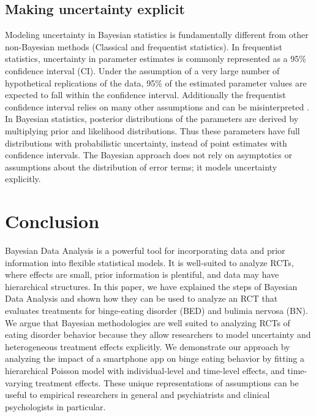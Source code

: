 \documentclass{article}
\begin{document}
\subsection{Making uncertainty explicit}
Modeling uncertainty in Bayesian statistics is fundamentally different from other non-Bayesian methods (Classical and frequentist statistics). In frequentist statistics, uncertainty in parameter estimates is commonly represented as a 95\% confidence interval (CI). Under the assumption of a very large number of hypothetical replications of the data, 95\% of the estimated parameter values are expected to fall within the confidence interval. Additionally the frequentist confidence interval relies on many other assumptions and can be misinterpreted \cite{hoekstra2014robust}. In Bayesian statistics, posterior distributions of the parameters are derived by multiplying prior and likelihood distributions. Thus these parameters have full distributions with probabilistic uncertainty, instead of point estimates with confidence intervals. The Bayesian approach does not rely on asymptotics or assumptions about the distribution of error terms; it models uncertainty explicitly.


\section{Conclusion}
Bayesian Data Analysis is a powerful tool for incorporating data and prior information into flexible statistical models.  It is well-suited to analyze RCTs, where effects are small, prior information is plentiful, and data may have hierarchical structures.  In this paper, we have explained the steps of Bayesian Data Analysis and shown how they can be used to analyze an RCT that evaluates treatments for binge-eating disorder (BED) and bulimia nervosa (BN).  We argue that Bayesian methodologies are well suited to analyzing RCTs of eating disorder behavior because they allow researchers to model uncertainty and heterogeneous treatment effects explicitly. We demonstrate our approach by analyzing the impact of a smartphone app on binge eating behavior by fitting a hierarchical Poisson model with individual-level and time-level effects, and time-varying treatment effects.  These unique representations of assumptions can be useful to empirical researchers in general and psychiatrists and clinical psychologists in particular.
 
 \newpage
 
\end{document}
